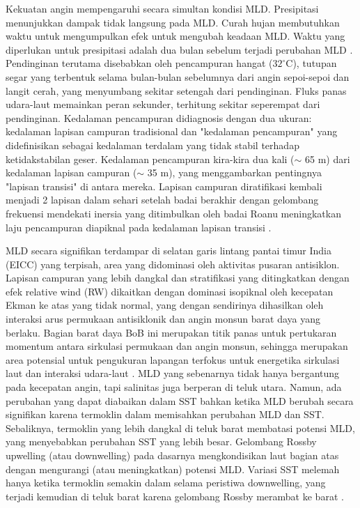 \begin{spacing}{1.5}
	Kekuatan angin mempengaruhi secara simultan kondisi MLD. Presipitasi menunjukkan dampak tidak langsung pada MLD. Curah hujan membutuhkan waktu untuk mengumpulkan efek untuk mengubah keadaan MLD. Waktu yang diperlukan untuk presipitasi adalah dua bulan sebelum terjadi perubahan MLD . Pendinginan terutama disebabkan oleh pencampuran hangat ($32^\circ$C), tutupan segar yang terbentuk selama bulan-bulan sebelumnya dari angin sepoi-sepoi dan langit cerah, yang menyumbang sekitar setengah dari pendinginan. Fluks panas udara-laut memainkan peran sekunder, terhitung sekitar seperempat dari pendinginan. Kedalaman pencampuran didiagnosis dengan dua ukuran: kedalaman lapisan campuran tradisional dan "kedalaman pencampuran" yang didefinisikan sebagai kedalaman terdalam yang tidak stabil terhadap ketidakstabilan geser. Kedalaman pencampuran kira-kira dua kali ($\sim$ 65 m) dari kedalaman lapisan campuran ($\sim$ 35 m), yang menggambarkan pentingnya "lapisan transisi" di antara mereka. Lapisan campuran diratifikasi kembali menjadi 2 lapisan dalam sehari setelah badai berakhir dengan gelombang frekuensi mendekati inersia yang ditimbulkan oleh badai Roanu meningkatkan laju pencampuran diapiknal pada kedalaman lapisan transisi . 
	
	MLD secara signifikan terdampar di selatan garis lintang pantai timur India (EICC) yang terpisah, area yang didominasi oleh aktivitas pusaran antisiklon. Lapisan campuran yang lebih dangkal dan stratifikasi yang ditingkatkan dengan efek relative wind (RW) dikaitkan dengan dominasi isopiknal oleh kecepatan Ekman ke atas yang tidak normal, yang dengan sendirinya dihasilkan oleh interaksi arus permukaan antisiklonik dan angin monsun barat daya yang berlaku. Bagian barat daya BoB ini merupakan titik panas untuk pertukaran momentum antara sirkulasi permukaan dan angin monsun, sehingga merupakan area potensial untuk pengukuran lapangan terfokus untuk energetika sirkulasi laut dan interaksi udara-laut . 	MLD yang sebenarnya tidak hanya bergantung pada kecepatan angin, tapi salinitas juga berperan di teluk utara. Namun, ada perubahan yang dapat diabaikan dalam SST bahkan ketika MLD berubah secara signifikan karena termoklin dalam memisahkan perubahan MLD dan SST. Sebaliknya, termoklin yang lebih dangkal di teluk barat membatasi potensi MLD, yang menyebabkan perubahan SST yang lebih besar. Gelombang Rossby upwelling (atau downwelling) pada dasarnya mengkondisikan laut bagian atas dengan mengurangi (atau meningkatkan) potensi MLD. Variasi SST melemah hanya ketika termoklin semakin dalam selama peristiwa downwelling, yang terjadi kemudian di teluk barat karena gelombang Rossby merambat ke barat . 
	

\end{spacing}
